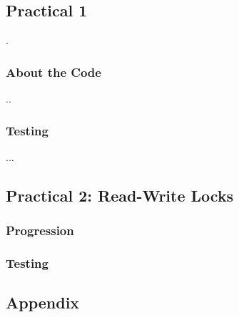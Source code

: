 \documentclass[11pt,a4paper]{article}
\theoremstyle{plain}
\theoremstyle{definition}
\theoremstyle{remark}
\numberwithin{equation}{section}
\begin{document}
\subsection*{Practical 1}

.


\subsubsection*{About the Code}

..


\subsubsection*{Testing}

...

\subsection*{Practical 2: Read-Write Locks}


\subsubsection*{Progression}



\subsubsection*{Testing}





\subsection*{Appendix}



%
%
\end{document}
